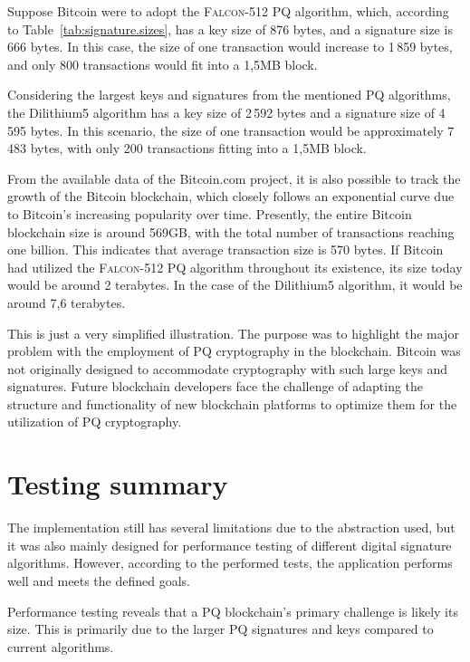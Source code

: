 Suppose Bitcoin were to adopt the \textsc{Falcon-512} PQ algorithm, which, according to Table~\ref{tab:signature.sizes}, has a key size of 876 bytes, and a signature size is 666 bytes. In this case, the size of one transaction would increase to 1\,859 bytes, and only 800 transactions would fit into a 1,5MB block.

Considering the largest keys and signatures from the mentioned PQ algorithms, the Dilithium5 algorithm has a key size of 2\,592 bytes and a signature size of 4\,595 bytes. In this scenario, the size of one transaction would be approximately 7\,483 bytes, with only 200 transactions fitting into a 1,5MB block.

From the available data of the Bitcoin.com project, it is also possible to track the growth of the Bitcoin blockchain, which closely follows an exponential curve due to Bitcoin's increasing popularity over time. Presently, the entire Bitcoin blockchain size is around 569GB, with the total number of transactions reaching one billion. This indicates that average transaction size is 570 bytes. If Bitcoin had utilized the \textsc{Falcon-512} PQ algorithm throughout its existence, its size today would be around 2 terabytes. In the case of the Dilithium5 algorithm, it would be around 7,6 terabytes.

This is just a very simplified illustration. The purpose was to highlight the major problem with the employment of PQ cryptography in the blockchain. Bitcoin was not originally designed to accommodate cryptography with such large keys and signatures. Future blockchain developers face the challenge of adapting the structure and functionality of new blockchain platforms to optimize them for the utilization of PQ cryptography.



\section*{Testing summary}

The implementation still has several limitations due to the abstraction used, but it was also mainly designed for performance testing of different digital signature algorithms. However, according to the performed tests, the application performs well and meets the defined goals.

Performance testing reveals that a PQ blockchain's primary challenge is likely its size. This is primarily due to the larger PQ signatures and keys compared to current algorithms. 


